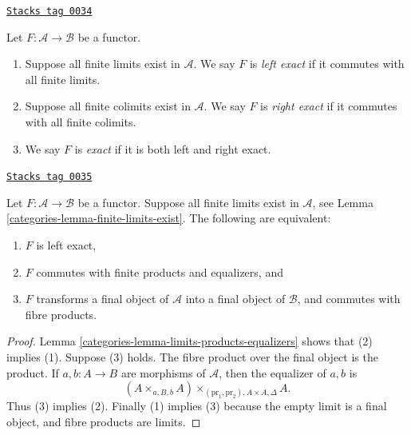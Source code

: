 \begin{definition}[Exact]
\label{categories-definition-exact}
\href{https://stacks.math.columbia.edu/tag/0034}{\texttt{Stacks tag 0034}}

Let $F : \mathcal{A} \to \mathcal{B}$ be a functor.
\begin{enumerate}
\item Suppose all finite limits exist in $\mathcal{A}$.
We say $F$ is {\it left exact} if it commutes
with all finite limits.
\item Suppose all finite colimits exist in $\mathcal{A}$.
We say $F$ is {\it right exact} if it commutes
with all finite colimits.
\item We say $F$ is {\it exact} if it is both left and right
exact.
\end{enumerate}
\end{definition}

\begin{lemma}
\label{categories-lemma-characterize-left-exact}
\href{https://stacks.math.columbia.edu/tag/0035}{\texttt{Stacks tag 0035}}

Let $F : \mathcal{A} \to \mathcal{B}$ be a functor.
Suppose all finite limits exist in $\mathcal{A}$,
see Lemma \ref{categories-lemma-finite-limits-exist}.
The following are equivalent:
\begin{enumerate}
\item $F$ is left exact,
\item $F$ commutes with finite products and equalizers, and
\item $F$ transforms a final object of $\mathcal{A}$
into a final object of $\mathcal{B}$, and commutes with fibre products.
\end{enumerate}
\end{lemma}

\begin{proof}

Lemma \ref{categories-lemma-limits-products-equalizers} shows that (2) implies (1).
Suppose (3) holds. The fibre product over the final object is the product.
If $a, b : A \to B$ are morphisms of $\mathcal{A}$, then the
equalizer of $a, b$ is
$$
(A \times_{a, B, b} A)\times_{(\text{pr}_1, \text{pr}_2), A \times A, \Delta} A.
$$
Thus (3) implies (2). Finally (1) implies (3) because
the empty limit is a final object, and fibre products are limits.
\end{proof}

